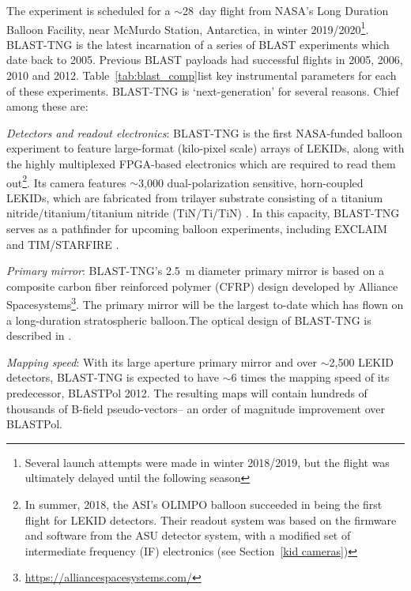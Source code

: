 {The experiment is scheduled for a $\sim$28~day flight from NASA's Long Duration Balloon Facility, near McMurdo Station, Antarctica, in winter 2019/2020\footnote{Several launch attempts were made in winter 2018/2019, but the flight was ultimately delayed until the following season}. BLAST-TNG is the latest incarnation of a series of BLAST experiments which date back to 2005. Previous BLAST payloads had successful flights in 2005, 2006, 2010 and 2012. Table~\ref{tab:blast_comp}list key instrumental parameters for each of these experiments. BLAST-TNG is `next-generation' for several reasons. Chief among these are:

\vspace{5mm}

\textit{Detectors and readout electronics}: BLAST-TNG is the first NASA-funded balloon experiment to feature large-format (kilo-pixel scale) arrays of LEKIDs, along with the highly multiplexed FPGA-based electronics which are required to read them out\footnote{In summer, 2018, the ASI's OLIMPO balloon succeeded in being the first flight for LEKID detectors. Their readout system was based on the firmware and software from the ASU detector system, with a modified set of intermediate frequency (IF) electronics (see Section~\ref{kid cameras})}. Its camera features $\sim$3,000 dual-polarization sensitive, horn-coupled LEKIDs, which are fabricated from trilayer substrate consisting of a titanium nitride/titanium/titanium nitride (TiN/Ti/TiN) \citep{hubmayr2014dual}. In this capacity, BLAST-TNG serves as a pathfinder for upcoming balloon experiments, including EXCLAIM \citep{switzer2017measuring} and TIM/STARFIRE \citep{aguirre2018starfire}.

\vspace{5mm}

\textit{Primary mirror}: BLAST-TNG's 2.5~m diameter primary mirror is based on a composite carbon fiber reinforced polymer (CFRP) design developed by Alliance Spacesystems\footnote{\url{https://alliancespacesystems.com/}}. The primary mirror will be the largest to-date which has flown on a long-duration stratospheric balloon.The optical design of BLAST-TNG is described in \citet{lourie2018design}.

\vspace{5mm}

\textit{Mapping speed}: With its large aperture primary mirror and over $\sim$2,500 LEKID detectors, BLAST-TNG is expected to have $\sim$6 times the mapping speed of its predecessor, BLASTPol 2012. The resulting maps will contain hundreds of thousands of B-field pseudo-vectors-- an order of magnitude improvement over BLASTPol.

}

